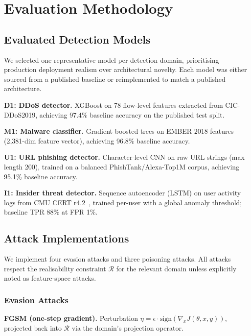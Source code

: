 \documentclass[sigconf,nonacm]{acmart}
\begin{document}
\section{Evaluation Methodology}
\label{sec:eval}

\subsection{Evaluated Detection Models}

We selected one representative model per detection domain, prioritising
production deployment realism over architectural novelty. Each model was either
sourced from a published baseline or reimplemented to match a published
architecture.

\textbf{D1: DDoS detector.} XGBoost on 78 flow-level features extracted from
CIC-DDoS2019, achieving 97.4\% baseline accuracy on the published test split.

\textbf{M1: Malware classifier.} Gradient-boosted trees on EMBER 2018
features~\cite{anderson2018ember} (2,381-dim feature vector), achieving 96.8\%
baseline accuracy.

\textbf{U1: URL phishing detector.} Character-level CNN on raw URL strings
(max length 200), trained on a balanced PhishTank/Alexa-Top1M corpus,
achieving 95.1\% baseline accuracy.

\textbf{I1: Insider threat detector.} Sequence autoencoder
(LSTM) on user activity logs from CMU CERT r4.2~\cite{cmu_cert}, trained
per-user with a global anomaly threshold; baseline TPR 88\% at FPR 1\%.

\subsection{Attack Implementations}

We implement four evasion attacks and three poisoning attacks. All attacks
respect the realisability constraint $\mathcal{R}$ for the relevant domain
unless explicitly noted as feature-space attacks.

\subsubsection{Evasion Attacks}

\textbf{FGSM (one-step gradient).} Perturbation
$\eta = \epsilon \cdot \mathrm{sign}(\nabla_x J(\theta, x, y))$, projected back
into $\mathcal{R}$ via the domain's projection operator.
\end{document}
